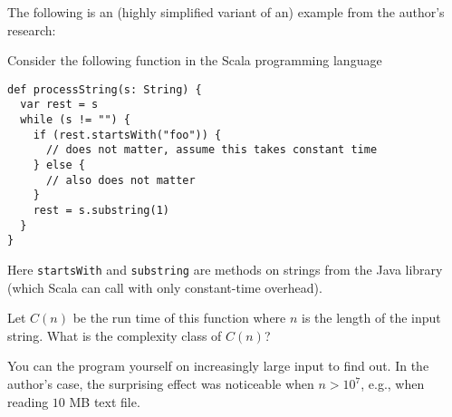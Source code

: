 \documentclass[a4paper]{article}
\begin{document}
\header

The following is an (highly simplified variant of an) example from the author's research:

\begin{example}\label{ex:ad:quadraticstringprocessor}
Consider the following function in the Scala programming language
\begin{lstlisting}
def processString(s: String) {
  var rest = s
  while (s != "") {
    if (rest.startsWith("foo")) {
      // does not matter, assume this takes constant time
    } else {
      // also does not matter
    }
    rest = s.substring(1)
  }
}
\end{lstlisting}
Here \lstinline|startsWith| and \lstinline|substring| are methods on strings from the Java library (which Scala can call with only constant-time overhead).

Let $C(n)$ be the run time of this function where $n$ is the length of the input string.
What is the complexity class of $C(n)$?

You can the program yourself on increasingly large input to find out.
In the author's case, the surprising effect was noticeable when $n>10^7$, e.g., when reading $10$ MB text file.
\end{example}
\end{document}

